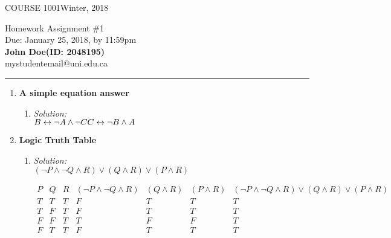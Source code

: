 \documentclass[11pt]{article}
\def\CourseCode{COURSE 1001}		%
\def\AssignmentNo{1}			%
\def\DateHandedOut{Winter, 2018}	%
\def\DateDue{January 25, 2018}		%
\def\TimeDue{11:59pm}			%
\def\Name{John Doe}
\def\StudentNumber{2048195}
\begin{document}
\noindent
\CourseCode \hfill \DateHandedOut\\

\begin{center}
Homework Assignment \#\AssignmentNo\\
Due: \DateDue, by \TimeDue\\



\textbf{\Name  (ID: \StudentNumber) } \\

mystudentemail@uni.edu.ca
\end{center}

\hrule\smallskip


% 
\begin{enumerate} 
\item \textbf{A simple equation answer} \marginpar{}
\begin{enumerate}
\item
{\em Solution: \\ 
    \( B \leftrightarrow \neg A \wedge \neg C  \\
       C \leftrightarrow \neg B \wedge A 
        \)
            
} 
\end{enumerate}

%  
\item \textbf{Logic Truth Table} \marginpar{}
\begin{enumerate} 
\item {\em Solution: \\ 
    $(\neg P \wedge \neg Q \wedge R)
    \vee (Q \wedge R) \vee (P \wedge R) $

    \begin{displaymath}
        \begin{array}{|c|c|c|c|c|c|c|}
            P & Q & R & (\neg P \wedge \neg Q \wedge R) & (Q 
            \wedge R) & (P \wedge R) & (\neg P \wedge \neg Q
            \wedge R) \vee (Q \wedge R) \vee (P \wedge R)\\ 
            \hline 

            T & T & T & F & T & T & T  \\
            T & F & T & F & T & T & T  \\ 
            F & F & T & T & F & F & T  \\
            F & T & T & F & T & T & T  \\
            
        \end{array}
    \end{displaymath}

}
\end{enumerate}
\end{enumerate}
\end{document}
